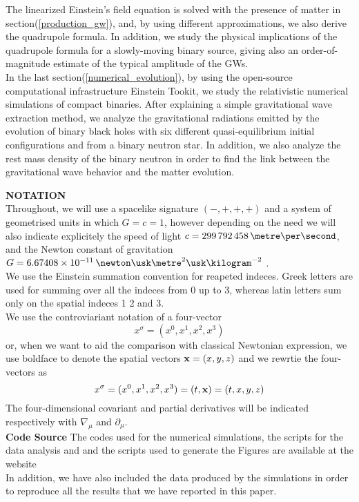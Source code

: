 The linearized Einstein's field equation is solved with the presence of matter in section(\ref{production_gw}), and, by using different approximations, we also derive the quadrupole formula. 
In addition, we study the physical implications of the quadrupole formula for a slowly-moving binary source, giving also an order-of-magnitude estimate of the typical amplitude of the GWs.\\
In the last section(\ref{numerical_evolution}), by using the open-source computational infrastructure Einstein Tookit\cite{loffler_einstein_2012}, we study the relativistic numerical simulations of compact binaries.
After explaining a simple gravitational wave extraction method, we analyze the gravitational radiations emitted by the evolution of binary black holes with six different quasi-equilibrium initial configurations and from a binary neutron star.
In addition, we also analyze the rest mass density of the binary neutron in order to find the link between the gravitational wave behavior and the matter evolution.

\textbf{NOTATION}\\
Throughout, we will use a spacelike signature $(-,+,+,+)$ and a system of geometrised units in which $G=c=1$, however depending on the need we will also indicate explicitely the speed of light $c=299\,792\,458 \,\metre \per \second$, and the Newton constant of gravitation $G=6.67408 \times 10^{-11} \, \newton \usk \metre^2 \usk \kilogram^{-2}$ \cite{codata_blog_codata_nodate}.\\
We use the Einstein summation convention for  reapeted indeces.
Greek letters are used for summing over all the indeces from 0 up to 3,
whereas latin letters sum only on the spatial indeces 1 2 and 3.\\
We use the controviariant notation of a four-vector
\[
x^{\sigma} = (x^{0},x^{1}, x^{2},x^{3})
\]
or, when we want to aid the comparison with classical Newtonian expression, we use boldface to denote the spatial vectors $\vb{x} =(x,y,z)$ and we rewrtie the four-vectors as 
\[
x^{\sigma} = (x^{0},x^{1}, x^{2},x^{3}) = (t,\vb{x}) = (t,x,y,z)
\]
The four-dimensional covariant and partial derivatives will be indicated respectively with $\nabla _{\mu}$ and $\partial _\mu$.\\

\textbf{Code Source}
The codes used for the numerical simulations, the scripts for the data analysis and and the scripts used to generate the Figures are available at the website\\
\url{}
In addition, we have also included the data produced by the simulations in order to reproduce all the results that we have reported in this paper. 
